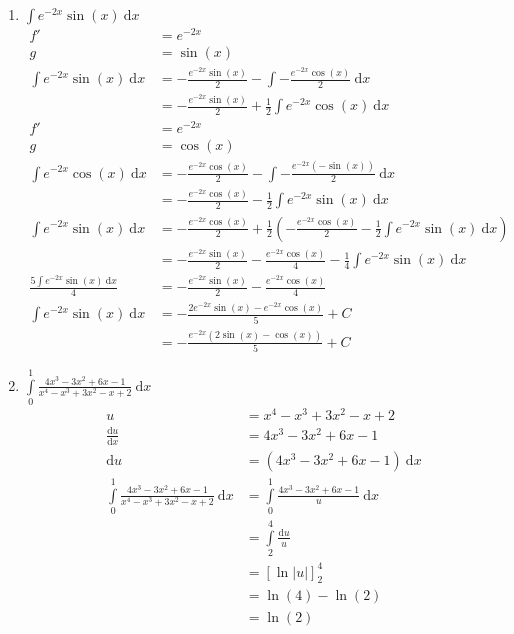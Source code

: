 \documentclass[10pt]{article}
\begin{document}
\begin{enumerate}[start=5,leftmargin=1in]
\begin{enumerate}
        \item $\int e^{-2x} \sin(x) \: \text{d}x$
        \begin{align*}
            f' &= e^{-2x} \\
            g &= \sin(x) \\
            \int e^{-2x} \sin(x) \: \text{d}x &= -\frac{e^{-2x} \sin(x)}{2} - \int -\frac{e^{-2x} \cos(x)}{2} \: \text{d}x \\
            &= -\frac{e^{-2x} \sin(x)}{2} + \frac{1}{2} \int e^{-2x} \cos(x) \: \text{d}x \\
            f' &= e^{-2x} \\
            g &= \cos(x) \\
            \int e^{-2x} \cos(x) \: \text{d}x &= -\frac{e^{-2x} \cos(x)}{2} - \int -\frac{e^{-2x} (-\sin(x))}{2} \: \text{d}x \\
            &= -\frac{e^{-2x} \cos(x)}{2} - \frac{1}{2} \int e^{-2x} \sin(x) \: \text{d}x \\
            \int e^{-2x} \sin(x) \: \text{d}x &= -\frac{e^{-2x} \cos(x)}{2}  + \frac{1}{2} \left(- \frac{e^{-2x} \cos(x)}{2} - \frac{1}{2} \int e^{-2x} \sin(x) \: \text{d}x\right) \\
            &= -\frac{e^{-2x} \sin(x)}{2} - \frac{e^{-2x} \cos(x)}{4} - \frac{1}{4} \int e^{-2x} \sin(x) \: \text{d}x \\
            \frac{5\int e^{-2x} \sin(x) \: \text{d}x}{4} &= -\frac{e^{-2x} \sin(x)}{2} - \frac{e^{-2x} \cos(x)}{4} \\
            \int e^{-2x} \sin(x) \: \text{d}x &= -\frac{2e^{-2x} \sin(x) - e^{-2x} \cos(x)}{5} + C \\
            &= -\frac{e^{-2x}(2\sin(x) - \cos(x))}{5} + C
        \end{align*}

        \item $\int\limits_0^1 \frac{4x^{3} - 3x^{2} + 6x - 1}{x^{4} - x^{3} + 3x^{2} - x + 2} \: \text{d}x$
        \begin{align*}
            u &= x^{4} - x^{3} + 3x^{2} - x + 2 \\
            \frac{\text{d}u}{\text{d}x} &= 4x^{3} - 3x^{2} + 6x - 1 \\
            \text{d}u &= (4x^{3} - 3x^{2} + 6x - 1) \: \text{d}x \\
            \int\limits_0^1 \frac{4x^{3} - 3x^{2} + 6x - 1}{x^{4} - x^{3} + 3x^{2} - x + 2} \: \text{d}x &= \int\limits_0^1 \frac{4x^{3} - 3x^{2} + 6x - 1}{u} \: \text{d}x \\
            &= \int\limits_2^4 \frac{\text{d}u}{u} \\
            &= [\ln|u|]_2^4 \\
            &= \ln(4) - \ln(2) \\
            &= \ln(2)
        \end{align*}

    \end{enumerate}
\end{enumerate}
\end{document}
